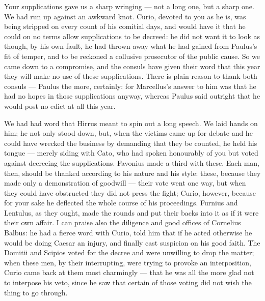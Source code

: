 

 Your supplications gave us a sharp wringing --- not a long one, but a sharp one. We had run up against an awkward knot. Curio, devoted to you as he is, was being stripped on every count of his comitial days, and would have it that he could on no terms allow supplications to be decreed: he did not want it to look as though, by his own fault, he had thrown away what he had gained from Paulus's fit of temper, and to be reckoned a collusive prosecutor of the public cause. So we came down to a compromise, and the consuls have given their word that this year they will make no use of these supplications. There is plain reason to thank both consuls --- Paulus the more, certainly: for Marcellus's answer to him was that he had no hopes in those supplications anyway, whereas Paulus said outright that he would post no edict at all this year.

 We had had word that Hirrus meant to spin out a long speech. We laid hands on him; he not only stood down, but, when the victims came up for debate and he could have wrecked the business by demanding that they be counted, he held his tongue --- merely siding with Cato, who had spoken honourably of you but voted against decreeing the supplications. Favonius made a third with these. Each man, then, should be thanked according to his nature and his style: these, because they made only a demonstration of goodwill --- their vote went one way, but when they could have obstructed they did not press the fight; Curio, however, because for your sake he deflected the whole course of his proceedings. Furnius and Lentulus, as they ought, made the rounds and put their backs into it as if it were their own affair. I can praise also the diligence and good offices of Cornelius Balbus: he had a fierce word with Curio, told him that if he acted otherwise he would be doing Caesar an injury, and finally cast suspicion on his good faith. The Domitii and Scipios voted for the decree and were unwilling to drop the matter; when these men, by their interrupting, were trying to provoke an interposition, Curio came back at them most charmingly --- that he was all the more glad not to interpose his veto, since he saw that certain of those voting did not wish the thing to go through.

